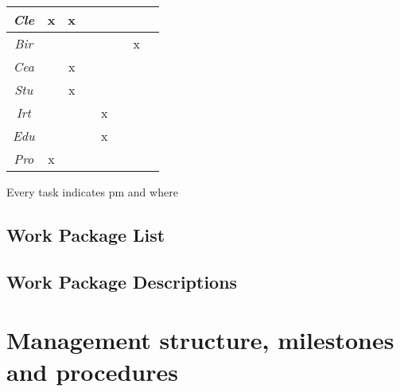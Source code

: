 \begin{center}
\begin{tabular}{|c|c|c|c|c|c|c|c|}
\hline
\textsl{Cle} & x & x &   &   &   &   &   \\
\hline
\textsl{Bir} &   &   &   &   &   & x &   \\
\hline
\textsl{Cea} &   & x &   &   &   &   &   \\
\hline
\textsl{Stu} &   & x &   &   &   &   &   \\
\hline
\textsl{Irt} &   &   &   & x &   &   &   \\
\hline
\textsl{Edu} &   &   &   & x &   &   &   \\
\hline
\textsl{Pro} & x &   &   &   &   &   &   \\
\hline
\end{tabular}
\end{center}



{\color{red} Every task indicates pm and where}


\subsection{Work Package List}\label{sec:wplist}

\wpfigstyle{\footnotesize}



\subsection{Work Package Descriptions}\label{sec:workpackages}
\begin{workplan}






%



\end{workplan}

\ganttchart[draft,xscale=.45] 

\section{Management structure, milestones and procedures}


